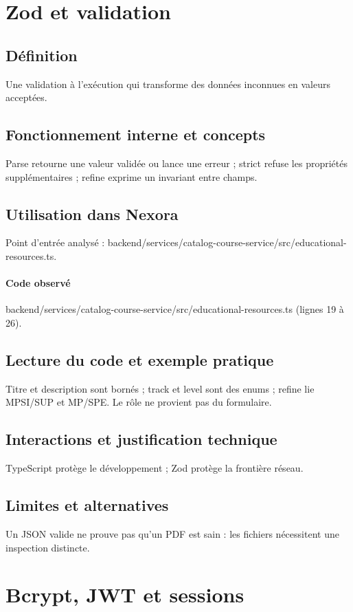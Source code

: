 \section{Zod et validation}
\subsection*{Définition}
Une validation à l’exécution qui transforme des données inconnues en valeurs acceptées.

\subsection*{Fonctionnement interne et concepts}
Parse retourne une valeur validée ou lance une erreur ; strict refuse les propriétés supplémentaires ; refine exprime un invariant entre champs.

\subsection*{Utilisation dans Nexora}
Point d’entrée analysé : backend/services/catalog-course-service/src/educational-resources.ts.

\paragraph{Code observé} backend/services/catalog-course-service/src/educational-resources.ts (lignes 19 à 26).

\subsection*{Lecture du code et exemple pratique}
Titre et description sont bornés ; track et level sont des enums ; refine lie MPSI/SUP et MP/SPE. Le rôle ne provient pas du formulaire.

\subsection*{Interactions et justification technique}
TypeScript protège le développement ; Zod protège la frontière réseau.

\subsection*{Limites et alternatives}
Un JSON valide ne prouve pas qu’un PDF est sain : les fichiers nécessitent une inspection distincte.

\section{Bcrypt, JWT et sessions}
